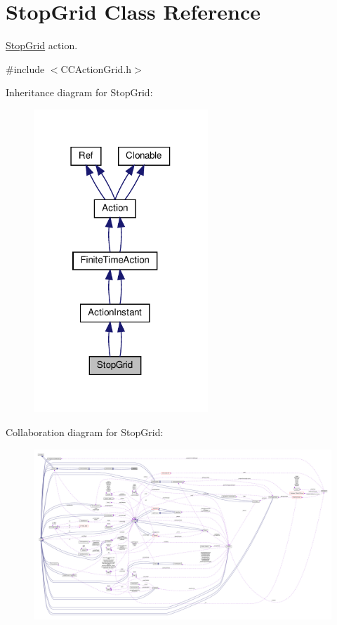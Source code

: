\hypertarget{classStopGrid}{}\section{Stop\+Grid Class Reference}
\label{classStopGrid}


\hyperlink{classStopGrid}{Stop\+Grid} action.  




{\ttfamily \#include $<$C\+C\+Action\+Grid.\+h$>$}



Inheritance diagram for Stop\+Grid\+:
\nopagebreak
\begin{figure}[H]
\begin{center}
\leavevmode
\includegraphics[width=186pt]{classStopGrid__inherit__graph}
\end{center}
\end{figure}


Collaboration diagram for Stop\+Grid\+:
\nopagebreak
\begin{figure}[H]
\begin{center}
\leavevmode
\includegraphics[width=350pt]{classStopGrid__coll__graph}
\end{center}
\end{figure}
